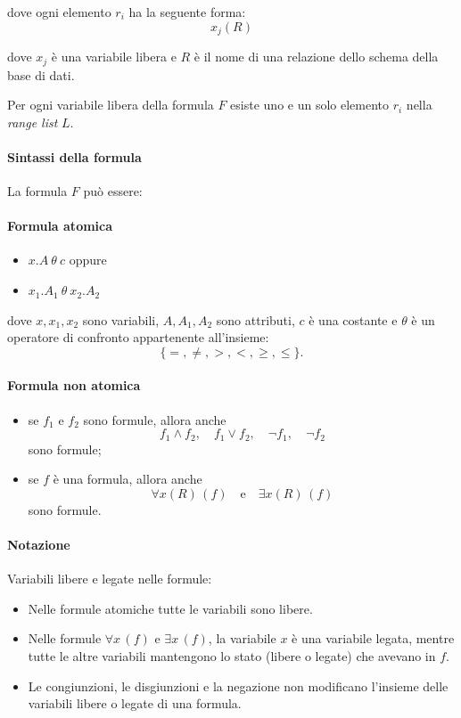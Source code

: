 dove ogni elemento $r_i$ ha la seguente forma:
\[
x_j(R)
\]

dove $x_j$ è una variabile libera e $R$ è il nome di una relazione dello schema della base di dati.

Per ogni variabile libera della formula $F$ esiste uno e un solo elemento $r_i$ nella \emph{range list} $L$.
\paragraph{Sintassi della formula}
La formula $F$ può essere:

\paragraph{Formula atomica}
\begin{itemize}
	\item $x.A \ \theta \ c$ \quad oppure
	\item $x_1.A_1 \ \theta \ x_2.A_2$
\end{itemize}

dove $x, x_1, x_2$ sono variabili, $A, A_1, A_2$ sono attributi, $c$ è una costante e $\theta$ è un operatore di confronto appartenente all’insieme:
\[
\{=, \neq, >, <, \geq, \leq\}.
\]

\paragraph{Formula non atomica}
\begin{itemize}
	\item se $f_1$ e $f_2$ sono formule, allora anche
	\[
	f_1 \land f_2,\quad f_1 \lor f_2,\quad \neg f_1,\quad \neg f_2
	\]
	sono formule;
	
	\item se $f$ è una formula, allora anche
	\[
	\forall x(R)\,(f) \quad \text{e} \quad \exists x(R)\,(f)
	\]
	sono formule.
\end{itemize}
\paragraph{Notazione} Variabili libere e legate nelle formule:
\begin{itemize}
	\item Nelle formule atomiche tutte le variabili sono libere.
	\item Nelle formule $\forall x\, (f)$ e $\exists x\, (f)$, la variabile $x$ è una variabile legata, mentre tutte le altre variabili mantengono lo stato (libere o legate) che avevano in $f$.
	\item Le congiunzioni, le disgiunzioni e la negazione non modificano l’insieme delle variabili libere o legate di una formula.
\end{itemize}
